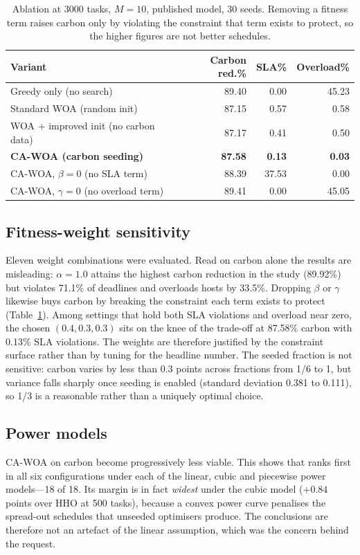 \documentclass[12pt,a4paper]{article}
\providecommand{\DIFaddtex}[1]{{\protect\color{blue} \sf #1}} %
\providecommand{\DIFdeltex}[1]{{\protect\color{red} \scriptsize #1}} %
\providecommand{\DIFaddbegin}{} %
\providecommand{\DIFaddend}{} %
\providecommand{\DIFdelbegin}{} %
\providecommand{\DIFdelend}{} %
\providecommand{\DIFadd}[1]{\texorpdfstring{\DIFaddtex{#1}}{#1}} %
\providecommand{\DIFdel}[1]{\texorpdfstring{\DIFdeltex{#1}}{}} %
\providecommand{\DIFscaledelfig}{0.5}
\newlength{\DIFdelgraphicswidth} %
\newlength{\DIFdelgraphicsheight} %
\providecommand{\DIFaddincludegraphics}[2][]{{\color{blue}\fbox{\DIFOincludegraphics[#1]{#2}}}} %
\providecommand{\DIFdelincludegraphics}[2][]{%
\sbox{\DIFdelgraphicsbox}{\DIFOincludegraphics[#1]{#2}}%
\settoboxwidth{\DIFdelgraphicswidth}{\DIFdelgraphicsbox} %
\settoboxtotalheight{\DIFdelgraphicsheight}{\DIFdelgraphicsbox} %
\scalebox{\DIFscaledelfig}{%
\parbox[b]{\DIFdelgraphicswidth}{\usebox{\DIFdelgraphicsbox}\\[-\baselineskip] \rule{\DIFdelgraphicswidth}{0em}}\llap{\resizebox{\DIFdelgraphicswidth}{\DIFdelgraphicsheight}{%
\setlength{\unitlength}{\DIFdelgraphicswidth}%
\begin{picture}(1,1)%
\thicklines\linethickness{2pt} %
{\color[rgb]{1,0,0}\put(0,0){\framebox(1,1){}}}%
{\color[rgb]{1,0,0}\put(0,0){\line( 1,1){1}}}%
{\color[rgb]{1,0,0}\put(0,1){\line(1,-1){1}}}%
\end{picture}%
}\hspace*{3pt}}} %
} %
\DeclareRobustCommand{\DIFaddbegin}{\DIFOaddbegin \let\includegraphics\DIFaddincludegraphics} %
\DeclareRobustCommand{\DIFaddend}{\DIFOaddend \let\includegraphics\DIFOincludegraphics} %
\DeclareRobustCommand{\DIFdelbegin}{\DIFOdelbegin \let\includegraphics\DIFdelincludegraphics} %
\DeclareRobustCommand{\DIFdelend}{\DIFOaddend \let\includegraphics\DIFOincludegraphics} %
\begin{document}
\begin{table}[H]\centering\footnotesize
\caption{Ablation at 3000 tasks, $M=10$, published model, 30 seeds. Removing a fitness term raises carbon
only by violating the constraint that term exists to protect, so the higher figures are not better
schedules.}\label{tab:ablation}
\begin{tabular}{lrrr}
\toprule
Variant & Carbon red.\% & SLA\% & Overload\% \\ \midrule
Greedy only (no search)              & 89.40 & 0.00  & 45.23 \\
Standard WOA (random init)           & 87.15 & 0.57  & 0.58 \\
WOA + improved init (no carbon data) & 87.17 & 0.41  & 0.50 \\
\textbf{CA-WOA (carbon seeding)}     & \textbf{87.58} & \textbf{0.13} & \textbf{0.03} \\
CA-WOA, $\beta=0$ (no SLA term)      & 88.39 & 37.53 & 0.00 \\
CA-WOA, $\gamma=0$ (no overload term)& 89.41 & 0.00  & 45.05 \\
\bottomrule
\end{tabular}
\end{table}

\subsection{\DIFadd{Fitness-weight sensitivity}}\label{sec:weights}
\DIFadd{Eleven weight combinations were evaluated. Read on carbon alone the results are misleading: $\alpha=1.0$
attains the highest carbon reduction in the study (89.92\%) but violates 71.1\% of deadlines and overloads
hosts by 33.5\%. Dropping $\beta$ or $\gamma$ likewise buys carbon by breaking the constraint each term
exists to protect (Table~\ref{tab:ablation}). Among settings that hold both SLA violations and overload near
zero, the chosen $(0.4,0.3,0.3)$ sits on the knee of the trade-off at 87.58\% carbon with 0.13\% SLA
violations. The weights are therefore justified by the constraint surface rather than by tuning for the
headline number. The seeded fraction is not sensitive: carbon varies by less than 0.3 points across fractions
from 1/6 to 1, but variance falls sharply once seeding is enabled (standard deviation 0.381 to 0.111), so
1/3 is a reasonable rather than a uniquely optimal choice.
}

\subsection{\DIFadd{Power models}}\label{sec:power}
\DIFaddend CA-WOA \DIFdelbegin \DIFdel{on carbon
become progressively less viable. This shows that }\DIFdelend \DIFaddbegin \DIFadd{ranks first in all six configurations under each of the linear, cubic and piecewise power models---18 of
18. Its margin is in fact \emph{widest} under the cubic model ($+0.84$ points over HHO at 500 tasks), because
a convex power curve penalises the spread-out schedules that unseeded optimisers produce. The conclusions are
therefore not an artefact of the linear assumption, which was the concern behind the request.
}
\end{document}
